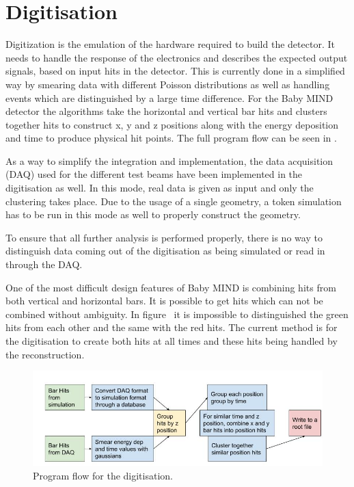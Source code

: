 \section{Digitisation}
Digitization is the emulation of the hardware required to build the detector. It needs to handle the response of the electronics and describes the expected output signals, based on input hits in the detector. This is currently done in a simplified way by smearing data with different Poisson distributions as well as handling events which are distinguished by a large time difference. For the Baby MIND detector the algorithms take the horizontal and vertical bar hits and clusters together hits to construct x, y and z positions along with the energy deposition and time to produce physical hit points. The full program flow can be seen in .

As a way to simplify the integration and implementation, the data acquisition (DAQ) used for the different test beams have been implemented in the digitisation as well. In this mode, real data is given as input and only the clustering takes place. Due to the usage of a single geometry, a token simulation has to be run in this mode as well to properly construct the geometry.

To ensure that all further analysis is performed properly, there is no way to distinguish data coming out of the digitisation as being simulated or read in through the DAQ.

One of the most difficult design features of Baby MIND is combining hits from both vertical and horizontal bars. It is possible to get hits which can not be combined without ambiguity. In figure~ it is impossible to distinguished the green hits from each other and the same with the red hits. The current method is for the digitisation to create both hits at all times and these hits being handled by the reconstruction.

\begin{figure}[h!]
\centering
\includegraphics[width=\textwidth]{figures/Digitisation.jpg}
\caption{Program flow for the digitisation.}
\label{fig:digi}
\end{figure}

